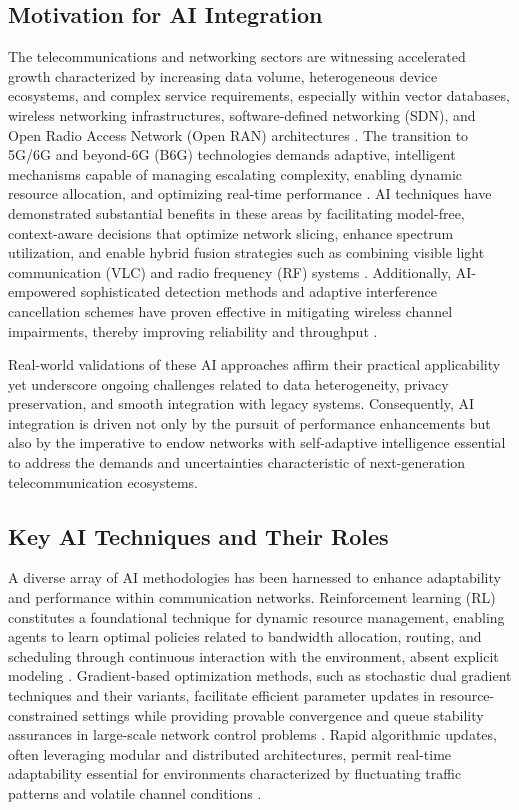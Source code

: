 \documentclass[sigconf]{acmart}
\begin{document}
\subsection{Motivation for AI Integration}

The telecommunications and networking sectors are witnessing accelerated growth characterized by increasing data volume, heterogeneous device ecosystems, and complex service requirements, especially within vector databases, wireless networking infrastructures, software-defined networking (SDN), and Open Radio Access Network (Open RAN) architectures \cite{ref21,ref22,ref23}. The transition to 5G/6G and beyond-6G (B6G) technologies demands adaptive, intelligent mechanisms capable of managing escalating complexity, enabling dynamic resource allocation, and optimizing real-time performance \cite{ref24,ref25}. AI techniques have demonstrated substantial benefits in these areas by facilitating model-free, context-aware decisions that optimize network slicing, enhance spectrum utilization, and enable hybrid fusion strategies such as combining visible light communication (VLC) and radio frequency (RF) systems \cite{ref51,ref52}. Additionally, AI-empowered sophisticated detection methods and adaptive interference cancellation schemes have proven effective in mitigating wireless channel impairments, thereby improving reliability and throughput \cite{ref54,ref55}. 

Real-world validations of these AI approaches affirm their practical applicability yet underscore ongoing challenges related to data heterogeneity, privacy preservation, and smooth integration with legacy systems. Consequently, AI integration is driven not only by the pursuit of performance enhancements but also by the imperative to endow networks with self-adaptive intelligence essential to address the demands and uncertainties characteristic of next-generation telecommunication ecosystems.

\subsection{Key AI Techniques and Their Roles}

A diverse array of AI methodologies has been harnessed to enhance adaptability and performance within communication networks. Reinforcement learning (RL) constitutes a foundational technique for dynamic resource management, enabling agents to learn optimal policies related to bandwidth allocation, routing, and scheduling through continuous interaction with the environment, absent explicit modeling \cite{ref11,ref12}. Gradient-based optimization methods, such as stochastic dual gradient techniques and their variants, facilitate efficient parameter updates in resource-constrained settings while providing provable convergence and queue stability assurances in large-scale network control problems \cite{ref13,ref14}. Rapid algorithmic updates, often leveraging modular and distributed architectures, permit real-time adaptability essential for environments characterized by fluctuating traffic patterns and volatile channel conditions \cite{ref15}. 
\end{document}
